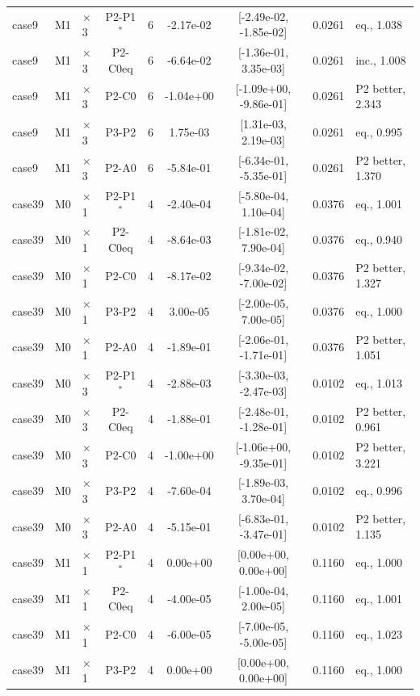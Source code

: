 {\begin{longtable}{lllcccccl}
case9 & M1 & $\times$3 & P2-P1$^*$ & 6 & -2.17e-02 & [-2.49e-02, -1.85e-02] & 0.0261 & eq., 1.038\\
case9 & M1 & $\times$3 & P2-C0eq & 6 & -6.64e-02 & [-1.36e-01, 3.35e-03] & 0.0261 & inc., 1.008\\
case9 & M1 & $\times$3 & P2-C0 & 6 & -1.04e+00 & [-1.09e+00, -9.86e-01] & 0.0261 & P2 better, 2.343\\
case9 & M1 & $\times$3 & P3-P2 & 6 & 1.75e-03 & [1.31e-03, 2.19e-03] & 0.0261 & eq., 0.995\\
case9 & M1 & $\times$3 & P2-A0 & 6 & -5.84e-01 & [-6.34e-01, -5.35e-01] & 0.0261 & P2 better, 1.370\\
case39 & M0 & $\times$1 & P2-P1$^*$ & 4 & -2.40e-04 & [-5.80e-04, 1.10e-04] & 0.0376 & eq., 1.001\\
case39 & M0 & $\times$1 & P2-C0eq & 4 & -8.64e-03 & [-1.81e-02, 7.90e-04] & 0.0376 & eq., 0.940\\
case39 & M0 & $\times$1 & P2-C0 & 4 & -8.17e-02 & [-9.34e-02, -7.00e-02] & 0.0376 & P2 better, 1.327\\
case39 & M0 & $\times$1 & P3-P2 & 4 & 3.00e-05 & [-2.00e-05, 7.00e-05] & 0.0376 & eq., 1.000\\
case39 & M0 & $\times$1 & P2-A0 & 4 & -1.89e-01 & [-2.06e-01, -1.71e-01] & 0.0376 & P2 better, 1.051\\
case39 & M0 & $\times$3 & P2-P1$^*$ & 4 & -2.88e-03 & [-3.30e-03, -2.47e-03] & 0.0102 & eq., 1.013\\
case39 & M0 & $\times$3 & P2-C0eq & 4 & -1.88e-01 & [-2.48e-01, -1.28e-01] & 0.0102 & P2 better, 0.961\\
case39 & M0 & $\times$3 & P2-C0 & 4 & -1.00e+00 & [-1.06e+00, -9.35e-01] & 0.0102 & P2 better, 3.221\\
case39 & M0 & $\times$3 & P3-P2 & 4 & -7.60e-04 & [-1.89e-03, 3.70e-04] & 0.0102 & eq., 0.996\\
case39 & M0 & $\times$3 & P2-A0 & 4 & -5.15e-01 & [-6.83e-01, -3.47e-01] & 0.0102 & P2 better, 1.135\\
case39 & M1 & $\times$1 & P2-P1$^*$ & 4 & 0.00e+00 & [0.00e+00, 0.00e+00] & 0.1160 & eq., 1.000\\
case39 & M1 & $\times$1 & P2-C0eq & 4 & -4.00e-05 & [-1.00e-04, 2.00e-05] & 0.1160 & eq., 1.001\\
case39 & M1 & $\times$1 & P2-C0 & 4 & -6.00e-05 & [-7.00e-05, -5.00e-05] & 0.1160 & eq., 1.023\\
case39 & M1 & $\times$1 & P3-P2 & 4 & 0.00e+00 & [0.00e+00, 0.00e+00] & 0.1160 & eq., 1.000\\

\end{longtable}}
